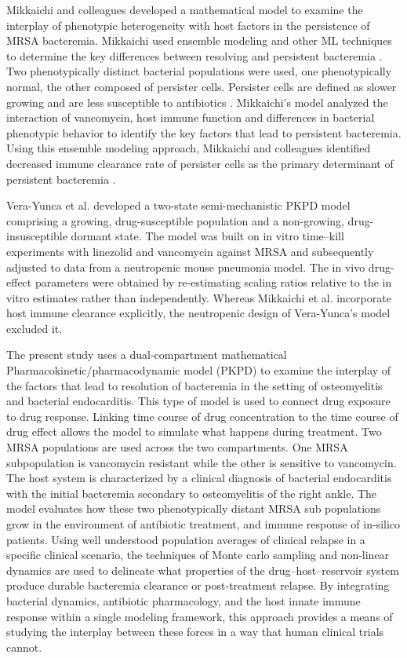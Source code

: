 \documentclass[12pt, draftcls, onecolumn]{IEEEtran}
\begin{document}
Mikkaichi and colleagues \cite{Mikkaichi2019} developed a mathematical model to examine the interplay of phenotypic heterogeneity
with host factors in the persistence of MRSA bacteremia.  Mikkaichi used ensemble modeling and other ML techniques to determine
the key differences between resolving and persistent bacteremia \cite{Mikkaichi2019}.
Two phenotypically distinct bacterial populations were used, one phenotypically normal, the other composed of persister cells.  
Persister cells are defined as slower growing and are less susceptible to antibiotics \cite{Mikkaichi2019}.
Mikkaichi's model analyzed the interaction of vancomycin, host immune function and differences in bacterial phenotypic behavior to identify the key factors that lead to persistent bacteremia.  Using this ensemble modeling approach, Mikkaichi and colleagues identified decreased immune clearance rate of persister cells as the primary determinant of persistent bacteremia \cite{Mikkaichi2019}. 

Vera-Yunca et al. developed a two-state semi-mechanistic PKPD model comprising a growing,
drug-susceptible population and a non-growing, drug-insusceptible dormant state. The model was built on in vitro time–kill
experiments with linezolid and vancomycin against MRSA and subsequently adjusted to data from a neutropenic mouse pneumonia model.
The in vivo drug-effect parameters were obtained by re-estimating scaling
ratios relative to the in vitro estimates rather than independently.
Whereas Mikkaichi et al. incorporate host immune clearance explicitly, the neutropenic design of Vera-Yunca's model excluded it.


The present study uses a dual-compartment mathematical Pharmacokinetic/pharmacodynamic model (PKPD)
to examine the interplay of the factors that lead to resolution of bacteremia in the setting of osteomyelitis and bacterial endocarditis.
This type of model is used to connect drug exposure to drug response.
Linking time course of drug concentration to the time course of drug effect allows the model to simulate what happens during treatment.
Two MRSA populations are used across the two compartments.  One MRSA subpopulation is vancomycin resistant
while the other is sensitive to vancomycin.  The host system is characterized by a clinical diagnosis of bacterial
endocarditis with the initial bacteremia secondary to osteomyelitis of the right ankle.
The model evaluates how these two phenotypically distant MRSA sub populations grow in the environment of antibiotic treatment,
and immune response of in-silico patients. Using well understood population averages of clinical relapse in a specific clinical scenario, the techniques of Monte carlo sampling and non-linear dynamics are used to delineate what properties of the drug–host–reservoir system produce durable bacteremia clearance or post-treatment relapse.  By integrating bacterial dynamics, antibiotic pharmacology, and the host innate immune response within a single modeling framework, this approach provides a means of studying the interplay between these forces in a way that human clinical trials cannot.  
 
\end{document}
